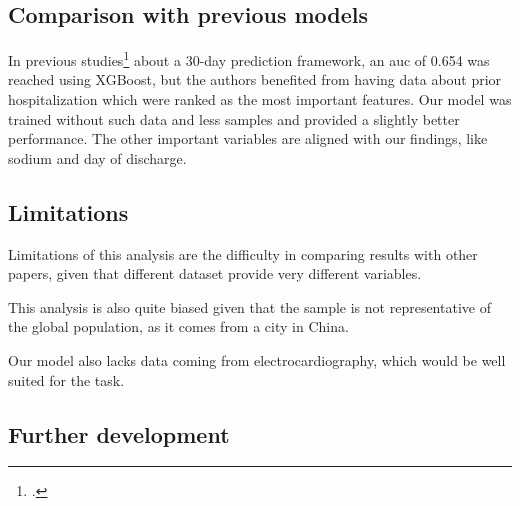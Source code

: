 


\subsection{Comparison with previous models}

In previous studies\footcite{Sharma2022Predicting} about a 30-day prediction framework, an \gls{auc} of 0.654 was reached using XGBoost, but the authors benefited from having data about prior hospitalization which were ranked as the most important features. Our model was trained without such data and less samples and provided a slightly better performance. The other important variables are aligned with our findings, like sodium and day of discharge.

\subsection{Limitations}

Limitations of this analysis are the difficulty in comparing results with other papers, given that different dataset provide very different variables.

This analysis is also quite biased given that the sample is not representative of the global population, as it comes from a city in China.

Our model also lacks data coming from electrocardiography, which would be well suited for the task.

\subsection{Further development}

